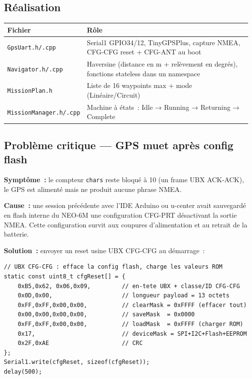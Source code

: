 \documentclass[12pt,a4paper]{article}
\newcommand{\file}[1]{\texttt{#1}}
\begin{document}
\subsection{Réalisation}

\begin{longtable}{L{4.5cm} L{8.5cm}}
  \toprule
  \textcolor{tableheadfg}{\textbf{Fichier}} &
  \textcolor{tableheadfg}{\textbf{Rôle}} \\
  \midrule
  \endhead
  \bottomrule
  \endfoot
  \file{GpsUart.h/.cpp} & Serial1 GPIO34/12, TinyGPSPlus, capture NMEA,
                          CFG-CFG reset + CFG-ANT au boot \\[3pt]
  \file{Navigator.h/.cpp} & Haversine (distance en m + relèvement en degrés),
                            fonctions stateless dans un namespace \\[3pt]
  \file{MissionPlan.h} & Liste de 16 waypoints max + mode (Linéaire/Circuit) \\[3pt]
  \file{MissionManager.h/.cpp} & Machine à états~: Idle → Running →
                                  Returning → Complete \\
\end{longtable}

\subsection{Problème critique — GPS muet après config flash}

\begin{warningbox}
  \textbf{Symptôme~:} le compteur \texttt{chars} reste bloqué à 10 (un frame
  UBX ACK-ACK), le GPS est alimenté mais ne produit aucune phrase NMEA.

  \textbf{Cause~:} une session précédente avec l'IDE Arduino ou u-center avait
  sauvegardé en flash interne du NEO-6M une configuration CFG-PRT désactivant
  la sortie NMEA. Cette configuration survit aux coupures d'alimentation et au
  retrait de la batterie.

  \textbf{Solution~:} envoyer un reset usine UBX CFG-CFG au démarrage~:
\end{warningbox}

\begin{lstlisting}[style=cpp, caption={GpsUart.cpp -- reset usine NEO-6M au demarrage}]
// UBX CFG-CFG : efface la config flash, charge les valeurs ROM
static const uint8_t cfgReset[] = {
    0xB5,0x62, 0x06,0x09,         // en-tete UBX + classe/ID CFG-CFG
    0x0D,0x00,                    // longueur payload = 13 octets
    0xFF,0xFF,0x00,0x00,          // clearMask = 0xFFFF (effacer tout)
    0x00,0x00,0x00,0x00,          // saveMask  = 0x0000
    0xFF,0xFF,0x00,0x00,          // loadMask  = 0xFFFF (charger ROM)
    0x17,                         // deviceMask = SPI+I2C+Flash+EEPROM
    0x2F,0xAE                     // CRC
};
Serial1.write(cfgReset, sizeof(cfgReset));
delay(500);
\end{lstlisting}
\end{document}
